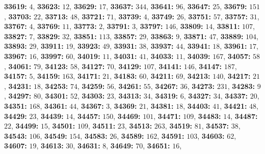 \textsf{\bfseries 33619:} $4$, \textsf{\bfseries 33623:} $12$, \textsf{\bfseries 33629:} $17$, \textsf{\bfseries 33637:} $344$, \textsf{\bfseries 33641:} $96$, \textsf{\bfseries 33647:} $25$, \textsf{\bfseries 33679:} $151$, \textsf{\bfseries 33703:} $22$, \textsf{\bfseries 33713:} $48$, \textsf{\bfseries 33721:} $71$, \textsf{\bfseries 33739:} $4$, \textsf{\bfseries 33749:} $26$, \textsf{\bfseries 33751:} $57$, \textsf{\bfseries 33757:} $31$, \textsf{\bfseries 33767:} $4$, \textsf{\bfseries 33769:} $11$, \textsf{\bfseries 33773:} $2$, \textsf{\bfseries 33791:} $3$, \textsf{\bfseries 33797:} $146$, \textsf{\bfseries 33809:} $14$, \textsf{\bfseries 33811:} $107$, \textsf{\bfseries 33827:} $7$, \textsf{\bfseries 33829:} $32$, \textsf{\bfseries 33851:} $113$, \textsf{\bfseries 33857:} $29$, \textsf{\bfseries 33863:} $9$, \textsf{\bfseries 33871:} $47$, \textsf{\bfseries 33889:} $104$, \textsf{\bfseries 33893:} $29$, \textsf{\bfseries 33911:} $19$, \textsf{\bfseries 33923:} $49$, \textsf{\bfseries 33931:} $38$, \textsf{\bfseries 33937:} $44$, \textsf{\bfseries 33941:} $18$, \textsf{\bfseries 33961:} $17$, \textsf{\bfseries 33967:} $16$, \textsf{\bfseries 33997:} $60$, \textsf{\bfseries 34019:} $11$, \textsf{\bfseries 34031:} $41$, \textsf{\bfseries 34033:} $11$, \textsf{\bfseries 34039:} $167$, \textsf{\bfseries 34057:} $58$, \textsf{\bfseries 34061:} $79$, \textsf{\bfseries 34123:} $58$, \textsf{\bfseries 34127:} $70$, \textsf{\bfseries 34129:} $107$, \textsf{\bfseries 34141:} $146$, \textsf{\bfseries 34147:} $187$, \textsf{\bfseries 34157:} $5$, \textsf{\bfseries 34159:} $163$, \textsf{\bfseries 34171:} $21$, \textsf{\bfseries 34183:} $60$, \textsf{\bfseries 34211:} $69$, \textsf{\bfseries 34213:} $140$, \textsf{\bfseries 34217:} $21$, \textsf{\bfseries 34231:} $18$, \textsf{\bfseries 34253:} $74$, \textsf{\bfseries 34259:} $56$, \textsf{\bfseries 34261:} $55$, \textsf{\bfseries 34267:} $36$, \textsf{\bfseries 34273:} $231$, \textsf{\bfseries 34283:} $9$, \textsf{\bfseries 34297:} $80$, \textsf{\bfseries 34301:} $52$, \textsf{\bfseries 34303:} $23$, \textsf{\bfseries 34313:} $34$, \textsf{\bfseries 34319:} $6$, \textsf{\bfseries 34327:} $34$, \textsf{\bfseries 34337:} $20$, \textsf{\bfseries 34351:} $168$, \textsf{\bfseries 34361:} $44$, \textsf{\bfseries 34367:} $3$, \textsf{\bfseries 34369:} $21$, \textsf{\bfseries 34381:} $18$, \textsf{\bfseries 34403:} $41$, \textsf{\bfseries 34421:} $48$, \textsf{\bfseries 34429:} $23$, \textsf{\bfseries 34439:} $14$, \textsf{\bfseries 34457:} $150$, \textsf{\bfseries 34469:} $101$, \textsf{\bfseries 34471:} $109$, \textsf{\bfseries 34483:} $14$, \textsf{\bfseries 34487:} $22$, \textsf{\bfseries 34499:} $15$, \textsf{\bfseries 34501:} $109$, \textsf{\bfseries 34511:} $23$, \textsf{\bfseries 34513:} $263$, \textsf{\bfseries 34519:} $81$, \textsf{\bfseries 34537:} $38$, \textsf{\bfseries 34543:} $106$, \textsf{\bfseries 34549:} $154$, \textsf{\bfseries 34583:} $26$, \textsf{\bfseries 34589:} $162$, \textsf{\bfseries 34591:} $103$, \textsf{\bfseries 34603:} $62$, \textsf{\bfseries 34607:} $19$, \textsf{\bfseries 34613:} $30$, \textsf{\bfseries 34631:} $8$, \textsf{\bfseries 34649:} $70$, \textsf{\bfseries 34651:} $16$, 
